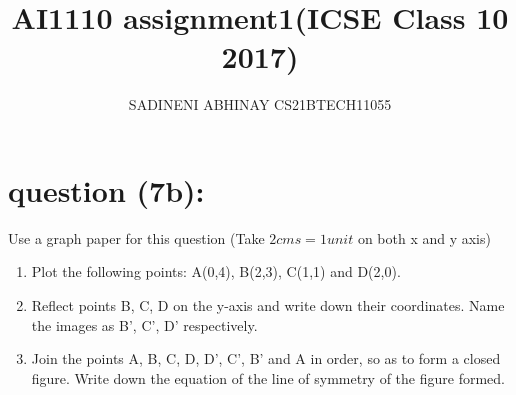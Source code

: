 \documentclass[journal,12pt,twocolumn]{IEEEtran}
\title{AI1110 assignment1(ICSE Class 10 2017)}
\author{SADINENI ABHINAY CS21BTECH11055}
\begin{document}
	\maketitle
	\section{question (7b):}
	Use a graph paper for this question (Take $2 cms = 1 unit$ on both x and y axis)\\
	\begin{enumerate}[ label=(1.\arabic*)]
		\item Plot the following points: A(0,4), B(2,3), C(1,1) and D(2,0).
		\item Reflect points B, C, D on the y-axis and write down their coordinates. Name
		the images as B', C', D' respectively.
		\item Join the points A, B, C, D, D', C', B' and A in order, so as to form a closed
		figure. Write down the equation of the line of symmetry of the figure formed.
	\end{enumerate}      
	
\end{document}
